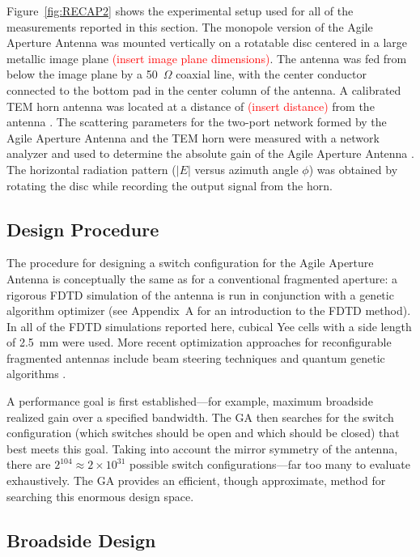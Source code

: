 Figure~\ref{fig:RECAP2} shows the experimental setup used for all of the measurements reported in this section.  The monopole version of the Agile Aperture Antenna was mounted vertically on a rotatable disc centered in a large metallic image plane \textcolor{red}{(insert image plane dimensions)}.  The antenna was fed from below the image plane by a 50~$\Omega$ coaxial line, with the center conductor connected to the bottom pad in the center column of the antenna.  A calibrated TEM horn antenna was located at a distance of \textcolor{red}{(insert distance)} from the antenna \cite{RECAP}.  The scattering parameters for the two-port network formed by the Agile Aperture Antenna and the TEM horn were measured with a network analyzer and used to determine the absolute gain of the Agile Aperture Antenna \cite{LeeSmith2004}.  The horizontal radiation pattern ($|E|$ versus azimuth angle $\phi$) was obtained by rotating the disc while recording the output signal from the horn.

\subsection{Design Procedure}

The procedure for designing a switch configuration for the Agile Aperture Antenna is conceptually the same as for a conventional fragmented aperture: a rigorous FDTD simulation of the antenna is run in conjunction with a genetic algorithm optimizer (see Appendix~A for an introduction to the FDTD method).  In all of the FDTD simulations reported here, cubical Yee cells with a side length of 2.5~mm were used.  More recent optimization approaches for reconfigurable fragmented antennas include beam steering techniques \cite{Towfiq2018Reconfigurable} and quantum genetic algorithms \cite{Bichara2021Miniaturized}.

A performance goal is first established---for example, maximum broadside realized gain over a specified bandwidth.  The GA then searches for the switch configuration (which switches should be open and which should be closed) that best meets this goal.  Taking into account the mirror symmetry of the antenna, there are $2^{104} \approx 2 \times 10^{31}$ possible switch configurations---far too many to evaluate exhaustively.  The GA provides an efficient, though approximate, method for searching this enormous design space.

\subsection{Broadside Design}

